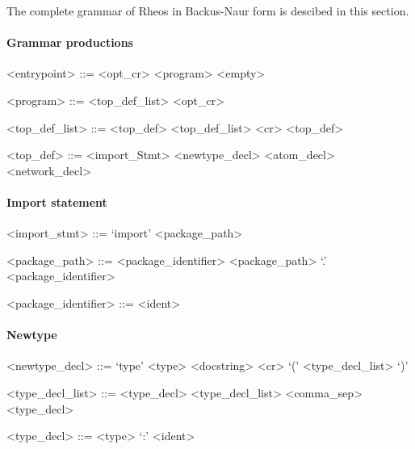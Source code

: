 The complete grammar of Rheos in Backus-Naur form is descibed in this
section.


\paragraph{Grammar productions}

\begin{grammar}
  <entrypoint> ::= <opt_cr> <program>
  \alt <empty>

  <program> ::= <top_def_list> <opt_cr>

  <top_def_list> ::= <top_def>
  \alt <top_def_list> <cr> <top_def>

  <top_def> ::= <import_Stmt>
  \alt <newtype_decl>
  \alt <atom_decl>
  \alt <network_decl>
\end{grammar}


\paragraph{Import statement}

\begin{grammar}
  <import_stmt> ::= `import' <package_path>

  <package_path> ::= <package_identifier>
  \alt <package_path> `.' <package_identifier>

  <package_identifier> ::= <ident>
\end{grammar}


\paragraph{Newtype}

\begin{grammar}
  <newtype_decl> ::= `type' <type> <docstring> <cr> `('
  <type_decl_list> `)'

  <type_decl_list> ::= <type_decl>
  \alt <type_decl_list> <comma_sep> <type_decl>

  <type_decl> ::= <type> `:' <ident>
\end{grammar}


